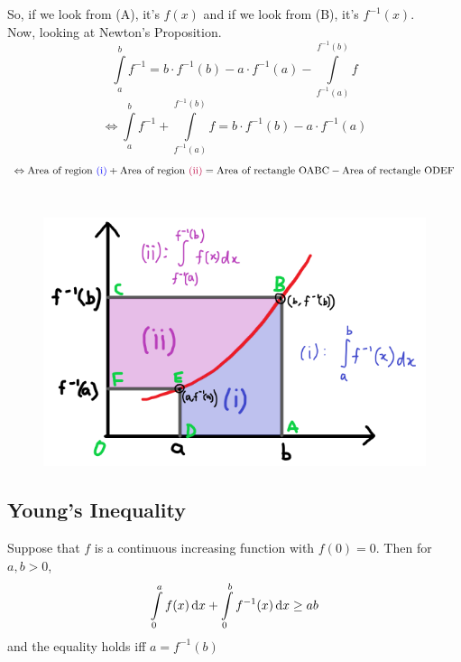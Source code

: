 \documentclass[14]{article}
\theoremstyle{definition}
\theoremstyle{case}
\begin{document}
So, if we look from {\color{red} (A)}, it's $f(x)$ and if we look from {\color{red} (B)}, it's $f^{-1}(x)$.\\
Now, looking at Newton's Proposition.
\[\int \limits_a^b f^{-1} = b \cdot f^{-1}(b) - a \cdot f^{-1}(a) - \int\limits_{f^{-1}(a)}^{f^{-1}(b)} f \]
\[\Leftrightarrow \int \limits_a^b f^{-1} + \int\limits_{f^{-1}(a)}^{f^{-1}(b)} f = b \cdot f^{-1}(b) - a \cdot f^{-1} (a)\]
\[\Leftrightarrow \text{Area of region {\color{blue}(i)}} + \text{Area of region {\color{purple}(ii)}} = \text{Area of rectangle OABC} - \text{Area of rectangle ODEF}\]\\
\begin{figure}[h]
\includegraphics[scale=0.73]{images/newton_prop_3}
\end{figure}
\pagebreak
\subsection{Young's Inequality}
Suppose that $f$ is a continuous increasing function with $f(0) = 0$. Then for $a, b > 0$,
\[\int\limits_0^a f(x) \dif x + \int\limits_0^b f^{-1}(x) \dif x  \geq ab\]
and the equality holds iff $a = f^{-1}(b)$
\end{document}
